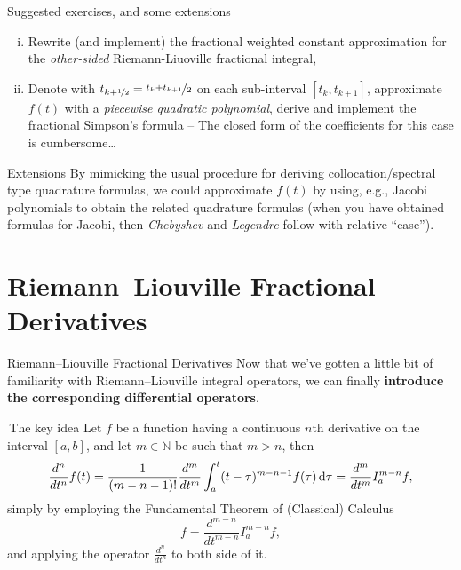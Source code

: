 \documentclass[aspectratio=169,xcolor=dvipsnames]{beamer}
\begin{document}
\begin{frame}{Suggested exercises, and some extensions}
\begin{enumerate}[(i)]
\item Rewrite (and implement) the fractional weighted constant approximation for the \emph{other-sided} Riemann-Liuoville fractional integral,
\item Denote with $t_{k + \nicefrac{1}{2}} = \nicefrac{t_{k} + t_{k+1}}{2}$ on each sub-interval $[t_k,t_{k+1}]$, approximate $f(t)$ with a \emph{piecewise quadratic polynomial}, derive and implement the fractional Simpson's formula -- \textcolor{danger}{\faExclamationTriangle} The closed form of the coefficients for this case is cumbersome\ldots
\end{enumerate}

\begin{block}{Extensions}
By mimicking the usual procedure for deriving collocation/spectral type quadrature formulas, we could approximate $f(t)$ by using, e.g., Jacobi polynomials to obtain the related quadrature formulas (when you have obtained formulas for Jacobi, then \emph{Chebyshev} and \emph{Legendre} follow with relative ``ease'').
\end{block}

\end{frame}

\section{Riemann--Liouville Fractional Derivatives}

\begin{frame}{Riemann--Liouville Fractional Derivatives}
Now that we've gotten a little bit of familiarity with Riemann--Liouville integral operators, we can finally \textbf{introduce the corresponding differential operators}.

\begin{block}{\faLightbulb[regular]\,The key idea }
Let $f$ be a function having a continuous $n$th derivative on the interval $[a,b]$, and let $m \in \mathbb{N}$ be such that $m > n$, then
\[
 \frac{d^n}{d t^n} f(t) = \frac{1}{(m-n-1)!} \frac{d^m}{d t^m} \int_{a}^{t} (t-\tau)^{m-n-1} f(\tau)\,{\rm d}\tau = \frac{d^m}{d t^m}  I_a^{m-n} f,
\]
simply by employing the \alert{Fundamental Theorem of (Classical) Calculus}
\[
f = \frac{d^{m-n}}{d t^{m-n}} I_a^{m-n}f,
\]
and applying the operator $\frac{d^n}{d t^n}$ to both side of it.
\end{block}
\end{frame}
\end{document}
